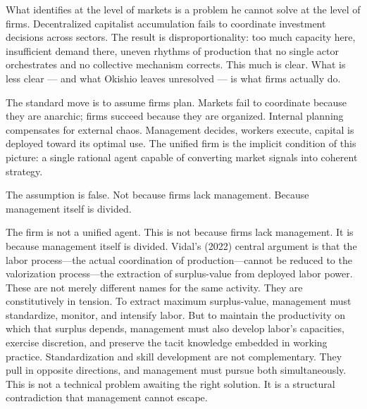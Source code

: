 What \citet{Okishio2022} identifies at the level of markets is a problem he cannot solve at the level of firms. Decentralized capitalist accumulation fails to coordinate investment decisions across sectors. The result is disproportionality: too much capacity here, insufficient demand there, uneven rhythms of production that no single actor orchestrates and no collective mechanism corrects. This much is clear. What is less clear — and what Okishio leaves unresolved — is what firms actually do.

The standard move is to assume firms plan. Markets fail to coordinate because they are anarchic; firms succeed because they are organized. Internal planning compensates for external chaos. Management decides, workers execute, capital is deployed toward its optimal use. The unified firm is the implicit condition of this picture: a single rational agent capable of converting market signals into coherent strategy.

The assumption is false. Not because firms lack management. Because management itself is divided.

The firm is not a unified agent. This is not because firms lack management. It is because management itself is divided. Vidal's (2022) central argument is that the labor process—the actual coordination of production—cannot be reduced to the valorization process—the extraction of surplus-value from deployed labor power. These are not merely different names for the same activity. They are constitutively in tension. To extract maximum surplus-value, management must standardize, monitor, and intensify labor. But to maintain the productivity on which that surplus depends, management must also develop labor's capacities, exercise discretion, and preserve the tacit knowledge embedded in working practice. Standardization and skill development are not complementary. They pull in opposite directions, and management must pursue both simultaneously. This is not a technical problem awaiting the right solution. It is a structural contradiction that management cannot escape.

